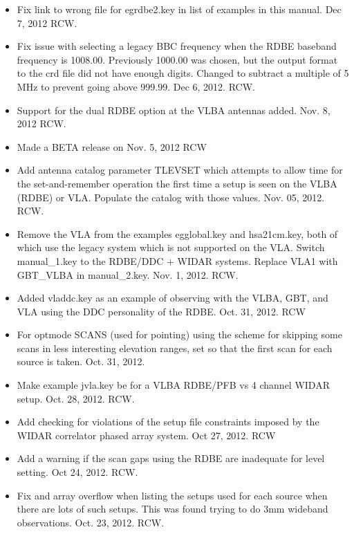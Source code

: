 \documentclass{report}
\begin{document}
\begin{itemize}
\item Fix link to wrong file for egrdbe2.key in list of examples in
this manual.  Dec 7, 2012  RCW.

\item Fix issue with selecting a legacy BBC frequency when the RDBE
baseband frequency is 1008.00.  Previously 1000.00 was chosen, but
the output format to the crd file did not have enough digits.  Changed
to subtract a multiple of 5 MHz to prevent going above 999.99.
Dec 6, 2012. RCW.

\item Support for the dual RDBE option at the VLBA antennas added.
Nov. 8, 2012  RCW.

\item Made a BETA release on Nov. 5, 2012  RCW

\item Add antenna catalog parameter TLEVSET which attempts to allow
time for the set-and-remember operation the first time a setup is seen
on the VLBA (RDBE) or VLA.  Populate the catalog with those values.
Nov. 05, 2012.  RCW.

\item Remove the VLA from the examples egglobal.key and hsa21cm.key, both
of which use the legacy system which is not supported on the VLA.  Switch
manual\_1.key to the RDBE/DDC + WIDAR systems.  Replace VLA1 with GBT\_VLBA
in manual\_2.key.  Nov. 1, 2012.  RCW.

\item Added vladdc.key as an example of observing with the VLBA, GBT, 
and VLA using the DDC personality of the RDBE.  Oct. 31, 2012.  RCW

\item For optmode SCANS (used for pointing) using the scheme for 
skipping some scans in less interesting elevation ranges, set so 
that the first scan for each source is taken.  Oct. 31, 2012.

\item Make example jvla.key be for a VLBA RDBE/PFB vs 4 channel WIDAR setup.
Oct. 28, 2012.  RCW.

\item Add checking for violations of the setup file constraints imposed
by the WIDAR correlator phased array system.  Oct 27, 2012.  RCW

\item Add a warning if the scan gaps using the RDBE are inadequate for
level setting.  Oct 24, 2012.  RCW.

\item Fix and array overflow when listing the setups used for each source
when there are lots of such setups.  This was found trying to do 3mm 
wideband observations.  Oct. 23, 2012.  RCW.


\end{itemize}
\end{document}
